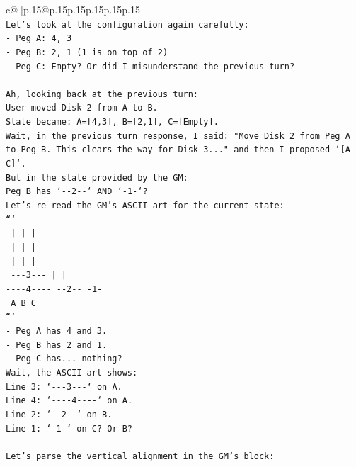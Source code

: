\documentclass{article}
\begin{document}
{\begin{supertabular}{c@{$\;$}|p{.15\linewidth}@{}p{.15\linewidth}p{.15\linewidth}p{.15\linewidth}p{.15\linewidth}p{.15\linewidth}}
{{{\\ 
\texttt{Let's look at the configuration again carefully:} \\
\texttt{{-} Peg A: 4, 3} \\
\texttt{{-} Peg B: 2, 1 (1 is on top of 2)} \\
\texttt{{-} Peg C: Empty? Or did I misunderstand the previous turn?} \\
\\ 
\texttt{Ah, looking back at the previous turn:} \\
\texttt{User moved Disk 2 from A to B.} \\
\texttt{State became: A={[}4,3{]}, B={[}2,1{]}, C={[}Empty{]}.} \\
\texttt{Wait, in the previous turn response, I said: "Move Disk 2 from Peg A to Peg B. This clears the way for Disk 3..." and then I proposed `{[}A C{]}`.} \\
\texttt{But in the state provided by the GM:} \\
\texttt{Peg B has `{-}{-}2{-}{-}` AND `{-}1{-}`?} \\
\texttt{Let's re{-}read the GM's ASCII art for the current state:} \\
\texttt{```} \\
\texttt{    |         |         |    } \\
\texttt{    |         |         |    } \\
\texttt{    |         |         |    } \\
\texttt{ {-}{-}{-}3{-}{-}{-}      |         |    } \\
\texttt{{-}{-}{-}{-}4{-}{-}{-}{-}   {-}{-}2{-}{-}      {-}1{-}   } \\
\texttt{    A         B         C    } \\
\texttt{```} \\
\texttt{{-} Peg A has 4 and 3.} \\
\texttt{{-} Peg B has 2 and 1.} \\
\texttt{{-} Peg C has... nothing?} \\
\texttt{Wait, the ASCII art shows:} \\
\texttt{Line 3: `{-}{-}{-}3{-}{-}{-}` on A.} \\
\texttt{Line 4: `{-}{-}{-}{-}4{-}{-}{-}{-}` on A.} \\
\texttt{Line 2: `{-}{-}2{-}{-}` on B.} \\
\texttt{Line 1: `{-}1{-}` on C? Or B?} \\
\\ 
\texttt{Let's parse the vertical alignment in the GM's block:} \\
}}}
\end{supertabular}}
\end{document}
